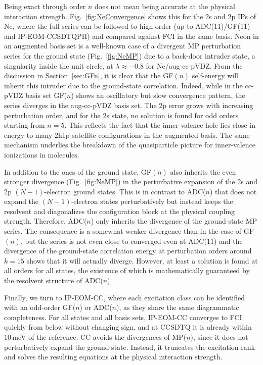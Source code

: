 \documentclass[aip,jcp,reprint,noshowkeys,superscriptaddress]{revtex4-2}
\begin{document}
Being exact through order $n$ does not mean being accurate at the physical interaction strength.
Fig.~\ref{fig:NeConvergence} shows this for the 2s and 2p IPs of Ne,
where the full series can be followed to high order (up to ADC(11)/GF(11) and IP-EOM-CCSDTQPH)
and compared against FCI in the same basis.
Neon in an augmented basis set is a well-known case of a divergent MP perturbation series for the ground state (Fig.~\ref{fig:NeMP})\cite{Olsen1996} due to a back-door intruder state, a singularity inside the unit circle, at $\lambda \approx -0.8$ for Ne/aug-cc-pVDZ.\cite{Olsen_2000}
From the discussion in Section~\ref{sec:GFn}, it is clear that the GF$(n)$ self-energy will inherit this intruder due to the ground-state correlation. Indeed, while in the cc-pVDZ basis set GF($n$) shows an oscillatory but slow convergence pattern, the series diverges in the aug-cc-pVDZ basis set. The 2p error grows with increasing perturbation order, and for the 2s state, no solution is found for odd orders starting from $n=5$. This reflects the fact that the inner-valence hole lies close in energy to many 2h1p satellite configurations in the augmented basis. The same mechanism underlies the breakdown of the quasiparticle picture for inner-valence ionizations in molecules.\cite{Cederbaum_1977,Schirmer_1978b} 

In addition to the ones of the ground state, GF$(n)$ also inherits the even stronger divergence (Fig.~\ref{fig:NeMP}) in the perturbative expansion of the 2s and 2p $(N-1)$-electron ground states. This is in contrast to ADC($n$) that does not expand the $(N-1)$-electron states perturbatively but instead keeps the resolvent and diagonalizes the configuration block at the physical coupling strength. Therefore, ADC($n$) only inherits the divergence of the ground-state MP series. The consequence is a somewhat weaker divergence than in the case of GF$(n)$, but the series is not even close to converged even at ADC($11$) and the divergence of the ground-state correlation energy at perturbation orders around $k=15$ shows that it will actually diverge. However, at least a solution is found at all orders for all states, the existence of which is mathematically guaranteed by the resolvent structure of ADC($n$).

Finally, we turn to IP-EOM-CC, where each excitation class can be identified with an odd-order GF($n$) or ADC($n$), as they share the same diagrammatic completeness. 
For all states and all basis sets, IP-EOM-CC converges to FCI quickly from below without changing sign, and at CCSDTQ it is already within 10\,meV of the reference. CC avoids the divergences of MP($n$), since it does not perturbatively expand the ground state. Instead, it truncates the excitation rank and solves the resulting equations at the physical interaction strength.
\end{document}
